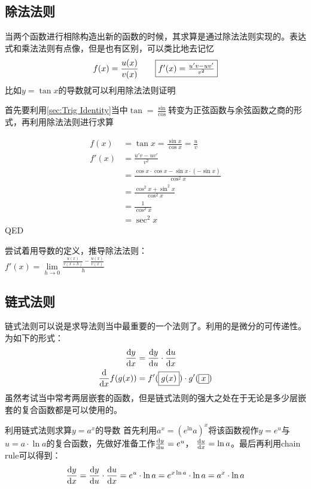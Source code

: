\subsection*{除法法则}
当两个函数进行相除构造出新的函数的时候，其求算是通过除法法则实现的。表达式和乘法法则有点像，但是也有区别，可以类比地去记忆
\[
	f(x) =\frac{u(x)}{v(x)} \qquad \fbox{$f'(x)=\frac{u'v-uv'}{v^2}$}
\]
比如$y=\tan x$的导数就可以利用除法法则证明
\begin{ExampleBox}
首先要利用\ref{sec:Trig Identity}当中$\tan =\frac{\sin}{\cos}$转变为正弦函数与余弦函数之商的形式，再利用除法法则进行求算

\begin{align*}
  f(x) &= \tan x =\frac{\sin x}{\cos x}=\frac{u}{v}\\
  f'(x)&= \frac{u'v-uv'}{v^2}\\
       &= \frac{\cos x\cdot \cos x- \sin x\cdot (-\sin x)}{\cos^2 x}\\
       &=\frac{\cos^2 x+\sin^2 x}{\cos^2 x}\\
       &=\frac{1}{\cos^2 x}\\
       &=\sec^2 x
\end{align*}
\gls{QED}
\end{ExampleBox}

\begin{TaskBox}
尝试着用导数的定义，推导除法法则：\\
$f'(x)=\lim\limits_{h\to 0}\frac{\frac{u(x)}{v(x+h)}-\frac{u(x)}{v(x)}}{h}$
\end{TaskBox}


\subsection*{链式法则}
链式法则可以说是求导法则当中最重要的一个法则了。利用的是微分的可传递性。为如下的形式：
\begin{align*}
 \frac{{\mathrm{d}} y}{{\mathrm{d}} x} &=\frac{{\mathrm{d}} y}{{\mathrm{d}} u} \cdot \frac{{\mathrm{d}} u}{{\mathrm{d}} x}\\
 \frac{{\mathrm{d}} }{{\mathrm{d}} x}f(g(x)) &= f'(\boxed{g(x)})\cdot g'(\boxed{x})
\end{align*}
虽然考试当中常考两层嵌套的函数，但是链式法则的强大之处在于无论是多少层嵌套的复合函数都是可以使用的。

\begin{ExampleBox}
利用链式法则求算$y=a^x$的导数
\tcblower
首先利用$a^x=\left(e^\ln a\right)^x$将该函数视作$y=e^u$与$u=a\cdot \ln a$的复合函数，先做好准备工作$\frac{{\mathrm{d}} y}{{\mathrm{d}} u}=e^u$， $\frac{{\mathrm{d}} u}{{\mathrm{d}} x}=\ln a$。最后再利用chain rule可以得到：
\[
\frac{{\mathrm{d}} y}{{\mathrm{d}} x} =\frac{{\mathrm{d}} y}{{\mathrm{d}} u}\cdot \frac{{\mathrm{d}} u}{{\mathrm{d}} x} =e^u\cdot \ln a =e^{x\ln a}\cdot \ln a =a^x \cdot \ln a 
\]
\end{ExampleBox}

